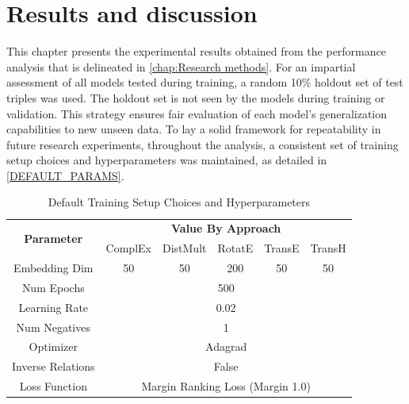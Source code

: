 \chapter{Results and discussion}
\label{chap:Results and discussion}

This chapter presents the experimental results obtained from the performance analysis that is delineated in \autoref{chap:Research methods}. For an impartial assessment of all models tested during training, a random 10\% holdout set of test triples was used. The holdout set is not seen by the models during training or validation. This strategy ensures fair evaluation of each model's generalization capabilities to new unseen data. To lay a solid framework for repeatability in future research experiments, throughout the analysis, a consistent set of training setup choices and hyperparameters was maintained, as detailed in \autoref{DEFAULT_PARAMS}.

\begin{table}
\caption{Default Training Setup Choices and Hyperparameters}
\label{DEFAULT_PARAMS}
\centering
\begin{tabular}{|c|c|c|c|c|c|}
\hline
\multirow[t]{2}{*}{\textbf{Parameter}} & \multicolumn{5}{c|}{\textbf{Value By Approach}} \bigstrut \\
\cline{2-6} 
& ComplEx & DistMult & RotatE & TransE & TransH \bigstrut \\
\hline 
Embedding Dim & 50 & 50 & 200 & 50 & 50 \\
\hline 
Num Epochs & \multicolumn{5}{c|}{500} \\
\hline 
Learning Rate & \multicolumn{5}{c|}{0.02} \\
\hline 
Num Negatives & \multicolumn{5}{c|}{1} \\
\hline
Optimizer & \multicolumn{5}{c|}{Adagrad} \\
\hline 
Inverse Relations & \multicolumn{5}{c|}{False} \\
\hline 
Loss Function & \multicolumn{5}{c|}{Margin Ranking Loss (Margin 1.0)} \\
\hline
\end{tabular}
\end{table}

